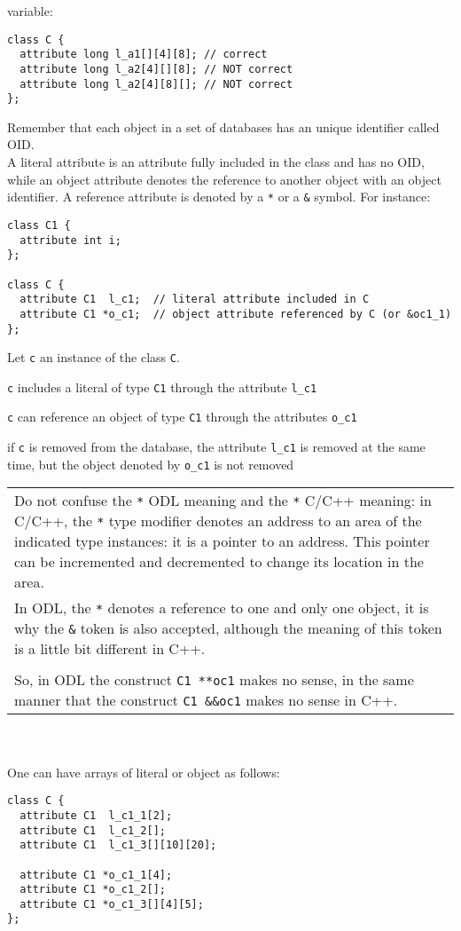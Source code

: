 variable:
\vspace{-0.2cm}
\begin{verbatim}
class C {
  attribute long l_a1[][4][8]; // correct
  attribute long l_a2[4][][8]; // NOT correct
  attribute long l_a2[4][8][]; // NOT correct
};
\end{verbatim}
Remember that each object in a set of \eyedb databases has an unique identifier called OID.
\\
A literal attribute is an attribute fully included in the class and has
no OID, while an object attribute denotes the reference
to another object with an object identifier.
A reference attribute is denoted by a \texttt{*} or a \texttt{\&} symbol.
For instance:
\vspace{-0.2cm}
\begin{verbatim}
class C1 {
  attribute int i;
};

class C {
  attribute C1  l_c1;  // literal attribute included in C
  attribute C1 *o_c1;  // object attribute referenced by C (or &oc1_1)
};
\end{verbatim}
Let \texttt{c} an instance of the class \texttt{C}.
\bi
\item \texttt{c} includes a literal of type \texttt{C1} through the attribute
\texttt{l\_c1}
\item \texttt{c} can reference an object of type \texttt{C1} through the attributes 
\texttt{o\_c1}
\item if \texttt{c} is removed from the database, the attribute \texttt{l\_c1}
is removed at the same time, but the object denoted by \texttt{o\_c1} is
not removed
\ei
\begin{tabular}{|p{16.8cm}|}
\hline
\vspace{0.1mm}
Do not confuse the \texttt{*} ODL meaning and the \texttt{*} C/C++ meaning:
in C/C++, the \texttt{*} type modifier denotes an address to an area of the
indicated type instances: it is a pointer to an address. This pointer
can be incremented and decremented to change its location in the area.
\\
In ODL, the \texttt{*} denotes a reference to one and only one object, it is why
the \texttt{\&} token is also accepted, although the meaning of this token
is a little bit different in C++.
\\
\\
So, in ODL the construct \texttt{C1 **oc1} makes no sense, in the same
manner that the construct \texttt{C1 \&\&oc1} makes no sense in C++.\\
\hline
\end{tabular}\\
\\
One can have arrays of literal or object as follows:
\vspace{-0.2cm}
\begin{verbatim}
class C {
  attribute C1  l_c1_1[2];
  attribute C1  l_c1_2[];
  attribute C1  l_c1_3[][10][20];

  attribute C1 *o_c1_1[4];
  attribute C1 *o_c1_2[];
  attribute C1 *o_c1_3[][4][5];
};
\end{verbatim}

